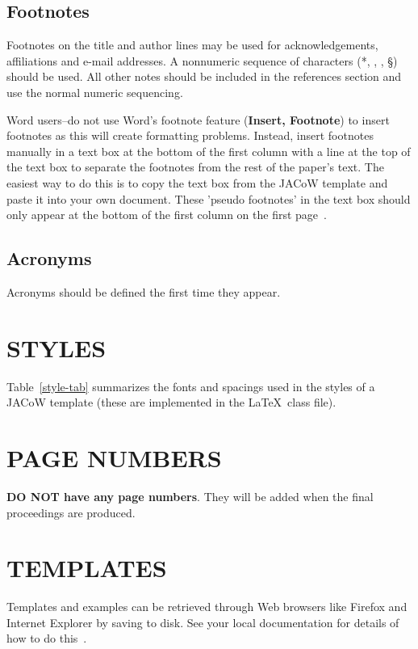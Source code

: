 \documentclass{JAC2003}
\begin{document}
\subsection{Footnotes}

Footnotes on the title and author lines may be used for acknowledgements,
affiliations and e-mail addresses. A nonnumeric sequence of characters (*,
\dag, \ddag, \S) should be used. All other notes should be included in the
references section and use the normal numeric sequencing.

Word users--do not use Word's footnote feature (\textbf{Insert, Footnote}) to insert
footnotes as this will create formatting problems. Instead, insert footnotes manually in a text box at the bottom of the first column with a line at the top of the text box to separate the footnotes from the rest of the paper's text.  The easiest way to do this is to copy the text box from the JACoW template and paste it into your own document.  These 'pseudo footnotes' in the text box should only appear at the bottom of the first column on the first page~\cite{exampl-ref2}.

\subsection{Acronyms}

Acronyms should be defined the first time they appear.

\section{STYLES}

Table~\ref{style-tab} summarizes the fonts and spacings used in the styles of
a JACoW template (these are implemented in the \LaTeX\ class file).

\section{PAGE NUMBERS}

\textbf{DO NOT have any page numbers}. They will be added 
when the final proceedings are produced.

\section{TEMPLATES}

Templates and examples can be retrieved through Web browsers like Firefox
and Internet Explorer by saving to disk. See your local documentation for
details of how to do this~\cite{exampl-ref3}.
\end{document}

